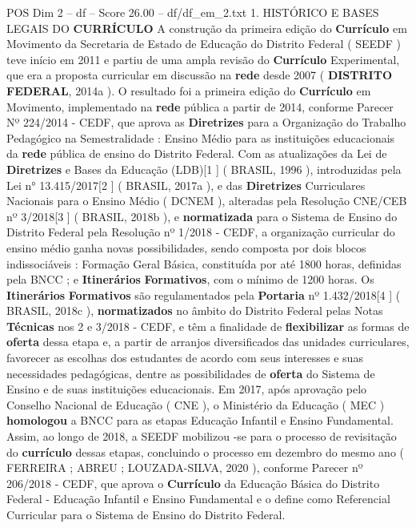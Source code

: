 \begin{textsample}{POS Dim 2 – df – Score 26.00 – df/df\_em\_2.txt}  \label{ex:f2_pos_123}
1.
HISTÓRICO E BASES LEGAIS DO \textbf{CURRÍCULO} A construção da primeira edição do \textbf{Currículo} em Movimento da Secretaria de Estado de Educação do Distrito Federal ( SEEDF ) teve início em 2011 e partiu de uma ampla revisão do \textbf{Currículo} Experimental, que era a proposta curricular em discussão na \textbf{rede} desde 2007 ( \textbf{DISTRITO} \textbf{FEDERAL}, 2014a ).
O resultado foi a primeira edição do \textbf{Currículo} em Movimento, implementado na \textbf{rede} pública a partir de 2014, conforme Parecer Nº 224/2014 - CEDF, que aprova as \textbf{Diretrizes} para a Organização do Trabalho Pedagógico na Semestralidade : Ensino Médio para as instituições educacionais da \textbf{rede} pública de ensino do Distrito Federal.
Com as atualizações da Lei de \textbf{Diretrizes} e Bases da Educação (LDB)[1 ] ( BRASIL, 1996 ), introduzidas pela Lei n{\EmojiFont °} 13.415/2017[2 ] ( BRASIL, 2017a ), e das \textbf{Diretrizes} Curriculares Nacionais para o Ensino Médio ( DCNEM ), alteradas pela Resolução CNE/CEB nº 3/2018[3 ] ( BRASIL, 2018b ), e \textbf{normatizada} para o Sistema de Ensino do Distrito Federal pela Resolução nº 1/2018 - CEDF, a organização curricular do ensino médio ganha novas possibilidades, sendo composta por dois blocos indissociáveis : Formação Geral Básica, constituída por até 1800 horas, definidas pela BNCC ; e \textbf{Itinerários} \textbf{Formativos}, com o mínimo de 1200 horas.
Os \textbf{Itinerários} \textbf{Formativos} são regulamentados pela \textbf{Portaria} nº 1.432/2018[4 ] ( BRASIL, 2018c ), \textbf{normatizados} no âmbito do Distrito Federal pelas Notas \textbf{Técnicas} nos 2 e 3/2018 - CEDF, e têm a finalidade de \textbf{flexibilizar} as formas de \textbf{oferta} dessa etapa e, a partir de arranjos diversificados das unidades curriculares, favorecer as escolhas dos estudantes de acordo com seus interesses e suas necessidades pedagógicas, dentre as possibilidades de \textbf{oferta} do Sistema de Ensino e de suas instituições educacionais.
Em 2017, após aprovação pelo Conselho Nacional de Educação ( CNE ), o Ministério da Educação ( MEC ) \textbf{homologou} a BNCC para as etapas Educação Infantil e Ensino Fundamental.
Assim, ao longo de 2018, a SEEDF mobilizou -se para o processo de revisitação do \textbf{currículo} dessas etapas, concluindo o processo em dezembro do mesmo ano ( FERREIRA ; ABREU ; LOUZADA-SILVA, 2020 ), conforme Parecer nº 206/2018 - CEDF, que aprova o \textbf{Currículo} da Educação Básica do Distrito Federal - Educação Infantil e Ensino Fundamental e o define como Referencial Curricular para o Sistema de Ensino do Distrito Federal.

\end{textsample}
